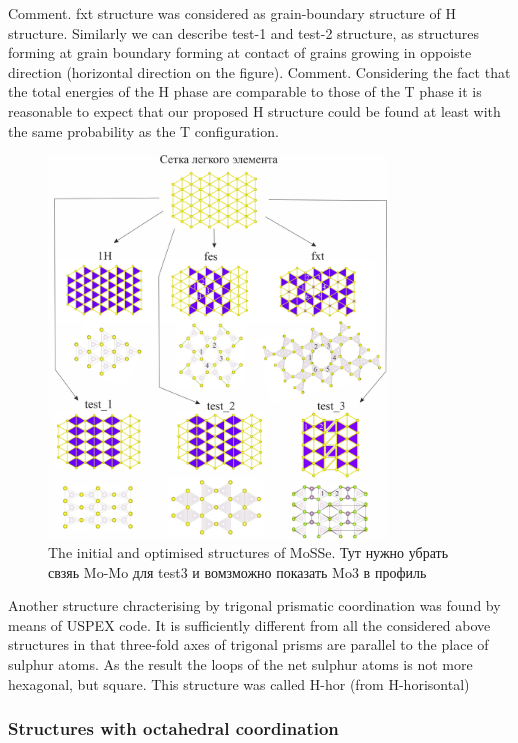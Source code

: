 \documentclass[a4paperm]{article}
\begin{document}
Comment. fxt structure was considered as grain-boundary structure of H structure. Similarly we can describe test-1 and test-2 structure, as structures forming at grain boundary forming at contact of grains growing in oppoiste direction (horizontal direction on the figure).
Comment. Considering the fact that the total energies of the H phase are comparable to those of the T phase it is reasonable to expect that our proposed H structure could be found at least with the same probability as the T configuration.

\begin{figure}[H] \centering
        \includegraphics[width=0.8\textwidth]{H-based.jpg}
        \caption{The initial and optimised structures of MoSSe. Тут нужно убрать свзяь Mo-Mo для test3 и вомзможно показать Mo3 в профиль}
\label{H-based}
\end{figure}


Another structure chracterising by trigonal prismatic coordination was found by means of USPEX code.
It is sufficiently different from all the considered above structures in that three-fold axes of trigonal prisms are parallel to the place of sulphur atoms.
As the result the loops of the net sulphur atoms is not more hexagonal, but square. 
This structure was called H-hor (from H-horisontal)

\subsubsection{Structures with octahedral coordination}
\end{document}
